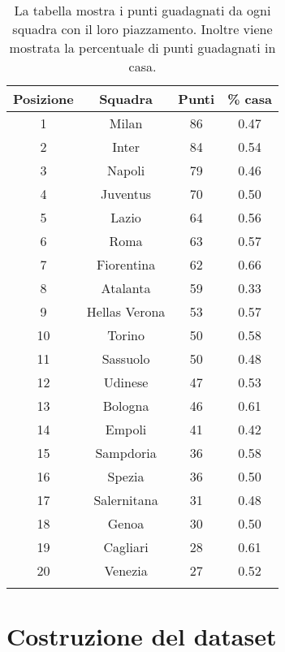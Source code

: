 \begin{table}[!htb]%
	
	\renewcommand{\arraystretch}{1.7}
	\centering
	\begin{tabular}{c c c c}
		\hline	
		
		\textbf{Posizione} & \textbf{Squadra} & \textbf{Punti} & \textbf{ \% casa}  \\	
		\hline			
		1 & Milan & 86 & 0.47\\
		2 & Inter & 84 & 0.54\\
		3 & Napoli & 79 & 0.46\\
		4 & Juventus & 70 & 0.50\\
		5 & Lazio & 64 & 0.56\\
		6 & Roma & 63 & 0.57\\
		7 & Fiorentina & 62 & 0.66\\
		8 & Atalanta & 59 & 0.33\\
		9 & Hellas Verona & 53 & 0.57\\
		10 & Torino & 50 & 0.58\\
		11 & Sassuolo & 50 & 0.48\\
		12 & Udinese & 47 & 0.53\\
		13 & Bologna & 46 & 0.61\\
		14 & Empoli & 41 & 0.42\\
		15 & Sampdoria & 36 & 0.58\\
		16 & Spezia & 36 & 0.50\\
		17 & Salernitana & 31 & 0.48\\
		18 & Genoa & 30 & 0.50\\
		19 & Cagliari & 28 & 0.61\\
		20 & Venezia & 27 & 0.52\\
		\hline
		& & & \\
		
	\end{tabular} \hbox{}
	
	\caption{La tabella mostra i punti guadagnati da ogni squadra con il loro piazzamento. Inoltre viene mostrata la percentuale di punti guadagnati in casa.} \label{tab:ranking}
\end{table}

\section{Costruzione del dataset}

